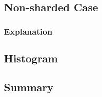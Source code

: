 \documentclass[11pt,a4paper]{article}
\begin{document}
\subsection{Non-sharded Case} \label{sec:gmg-false}

\subsubsection{Explanation} \label{sec:gmg-false-exp}

\subsection{Histogram} \label{sec:gmg-hist}

\subsection{Summary} \label{sec:gmg-summary}
\end{document}

